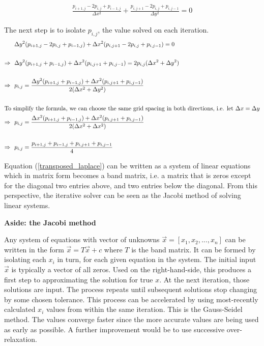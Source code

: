 \documentclass[11pt]{article}
\begin{document}
{\begin{align}
\frac{p_{i+1,j} - 2p_{i,j} + p_{i-1,j}}{\Delta x^2}
 + \frac{p_{i,j+1} - 2p_{i,j} + p_{i,j-1}}{\Delta y^2} = 0
\label{discrete_laplace}
\end{align}

The next step is to isolate $p_{i,j}$, the value solved on each iteration.
\begin{align}
&\Delta y^2 (p_{i+1,j} - 2p_{i,j} + p_{i-1,j}) + \Delta x^2 (p_{i,j+1} - 2p_{i,j} + p_{i,j-1}) = 0
	\nonumber \\ \nonumber \\
\Rightarrow ~~&
\Delta y^2 (p_{i+1,j} + p_{i-1,j}) + \Delta x^2 (p_{i,j+1} + p_{i,j-1})
 = 2p_{i,j} (\Delta x^2 + \Delta y^2)
	\nonumber \\ \nonumber \\
\Rightarrow ~~&
p_{i,j} = \frac{\Delta y^2 (p_{i+1,j} + p_{i-1,j}) + \Delta x^2 (p_{i,j+1} + p_{i,j-1})}
			 {2(\Delta x^2 + \Delta y^2)}
	\\ \nonumber \\
\intertext{To simplify the formula, we can choose the same grid spacing in both directions, i.e. let $\Delta x = \Delta y$}
\Rightarrow ~~&
p_{i,j} = \frac{\Delta x^2 (p_{i+1,j} + p_{i-1,j}) + \Delta x^2 (p_{i,j+1} + p_{i,j-1})}
			 {2(\Delta x^2 + \Delta x^2)}
	\nonumber \\ \nonumber \\
\Rightarrow ~~&
p_{i,j} = \frac{p_{i+1,j} + p_{i-1,j} + p_{i,j+1} + p_{i,j-1}}
			 {4}
\label{transposed_laplace}
\end{align}

Equation (\ref{transposed_laplace}) can be written as a system of linear equations which in
matrix form becomes a band matrix, i.e. a matrix that is zeros except for the diagonal
two entries above, and two entries below the diagonal. From this perspective, the iterative
solver can be seen as the Jacobi method of solving linear systems.

\textbf{Aside: the Jacobi method}

Any system of equations with vector of unknowns $\vec{x} = [x_1, x_2,... ,x_n]$ can be written
in the form $\vec{x} = T\vec{x} + c$ where $T$ is the band matrix. It can be formed by
isolating each $x_i$ in turn, for each given equation in the system. The initial input $\vec{x}$
is typically a vector of all zeros. Used on the right-hand-side, this produces a first step
to approximating the solution for true $x$. At the next iteration, those solutions are input.
The process repeats until subsequent solutions stop changing by some chosen tolerance.
This process can be accelerated by using most-recently calculated $x_i$ values from
within the same iteration. This is the Gauss-Seidel method. The values converge faster since
the more accurate values are being used as early as possible. A further improvement would
be to use successive over-relaxation.

}
\end{document}
